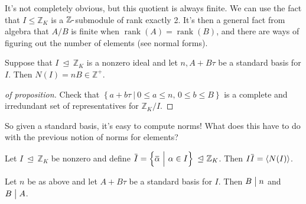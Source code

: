 \begin{remark}

It's not completely obvious, but this quotient is always finite. We can
use the fact that \(I\leq {\mathbb{Z}}_K\) is a
\({\mathbb{Z}}{\hbox{-}}\)submodule of rank exactly 2. It's then a
general fact from algebra that \(A/B\) is finite when
\(\operatorname{rank}(A) = \operatorname{rank}(B)\), and there are ways
of figuring out the number of elements (see normal forms).

\end{remark}

\begin{proposition}

Suppose that \(I{~\trianglelefteq~}{\mathbb{Z}}_K\) is a nonzero ideal
and let \(n, A+B \tau\) be a standard basis for \(I\). Then
\(N(I) = nB \in {\mathbb{Z}}^+\).

\end{proposition}

\begin{proof}[of proposition]

Check that
\(\left\{{ a + b \tau {~\mathrel{\Big|}~}0\leq a \leq n,\, 0 \leq b \leq B}\right\}\)
is a complete and irredundant set of representatives for
\({\mathbb{Z}}_K/I\).

\end{proof}

\begin{remark}

So given a standard basis, it's easy to compute norms! What does this
have to do with the previous notion of norms for elements?

\end{remark}

\begin{theorem}

Let \(I {~\trianglelefteq~}{\mathbb{Z}}_K\) be nonzero and define
\(\mkern 1.5mu\overline{\mkern-1.5muI\mkern-1.5mu}\mkern 1.5mu = \left\{{ \mkern 1.5mu\overline{\mkern-1.5mu\alpha \mkern-1.5mu}\mkern 1.5mu{~\mathrel{\Big|}~}\alpha \in I }\right\} {~\trianglelefteq~}{\mathbb{Z}}_K\).
Then
\(I \mkern 1.5mu\overline{\mkern-1.5muI\mkern-1.5mu}\mkern 1.5mu = \left\langle{ N(I) }\right\rangle\).

\end{theorem}

\begin{lemma}

Let \(n\) be as above and let \(A + B \tau\) be a standard basis for
\(I\). Then \(B\bigm|n\) and \(B\bigm|A\).

\end{lemma}


